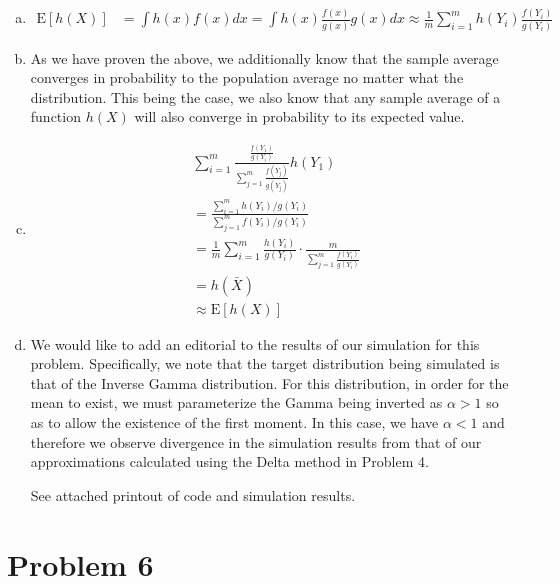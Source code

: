 \documentclass[11pt]{article}
\begin{document}
\begin{enumerate}[(a)]
\begin{enumerate}[(a)]
  \item 
    \begin{align*}
      \mathrm{E}[h(X)] &= \int h(x) f(x) dx = \int h(x)
      \frac{f(x)}{g(x)} g(x) dx \approx \frac{1}{m} \sum_{i=1}^m
      h(Y_i) \frac{f(Y_i)}{g(Y_i)}
    \end{align*}
  \item As we have proven the above, we additionally know that the
    sample average converges in probability to the population average
    no matter what the distribution.  This being the case, we also
    know that any sample average of a function $h(X)$ will also
    converge in probability to its expected value.
  \item 
    \begin{align*}
      &\sum_{i=1}^m \frac{\frac{f(Y_1)}{g(Y_i)}}{\sum_{j=1}^m
        \frac{f(Y_j)}{g(Y_j)}} h(Y_1) \\ 
      &= \frac{\sum_{i=1}^m
        h(Y_i)/g(Y_i)}{\sum_{j=1}^m f(Y_i)/g(Y_i)} \\
      &= \frac{1}{m} \sum_{i=1}^m \frac{h(Y_i)}{g(Y_i)} \cdot
      \frac{m}{\sum_{j=1}^m \frac{f(Y_i)}{g(Y_i)}} \\
      &= h(\bar{X}) \\
      &\approx \mathrm{E}[h(X)]
    \end{align*}
\newpage
\item We would like to add an editorial to the results of our
  simulation for this problem.  Specifically, we note that the target
  distribution being simulated is that of the Inverse Gamma
  distribution.  For this distribution, in order for the mean to
  exist, we must parameterize the Gamma being inverted as $\alpha > 1$
  so as to allow the existence of the first moment.  In this case, we
  have $\alpha < 1$ and therefore we observe divergence in the
  simulation results from that of our approximations calculated using
  the Delta method in Problem 4.

  See attached printout of code and simulation results.

\end{enumerate}

\section*{Problem 6}


\end{enumerate}
\end{document}
